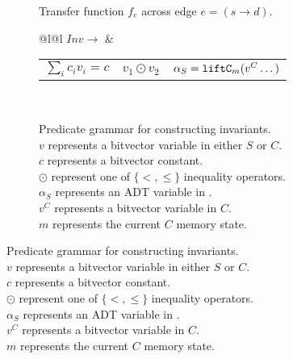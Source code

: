 \begin{figure}[H]
  \begin{center}
  \begin{subfigure}[t]{.46\textwidth}
  \begin{algorithm}[H]
  \begin{footnotesize}
  \SetAlgoLined
  \end{footnotesize}
  \end{algorithm}
  \caption{\label{algo:tf} Transfer function $f_e$ across
  edge $e=(s\rightarrow d)$.}
  \end{subfigure}%
  \hfill
  \hfill
  \begin{subfigure}[t]{.52\textwidth}
  \begin{center}
  \begin{tabular}{@{}l@{}l}
  $Inv \rightarrow$ &
  \begin{tabular}{@{}l|l|l@{}}
  $\sum_{i}{c_iv_i}=c$ & $v_1 \odot v_2$ & $\alpha_S = {\tt liftC}_m(v^{C} \dots)$
  \end{tabular}\\
  \end{tabular}%
  \vspace{7px}
  \end{center}
  \caption{\label{fig:invGrammar} Predicate grammar for constructing invariants.\\$v$ represents a bitvector variable in either $S$ or $C$. \\ $c$ represents a bitvector constant.\\$\odot$ represent one of $\{<,\leq\}$ inequality operators.\\$\alpha_S$ represents an ADT variable in \SpecL{}.\\$v^{C}$ represents a bitvector variable in $C$.\\$m$ represents the current $C$ memory state.}

\end{subfigure}
\end{center}
\end{figure}
